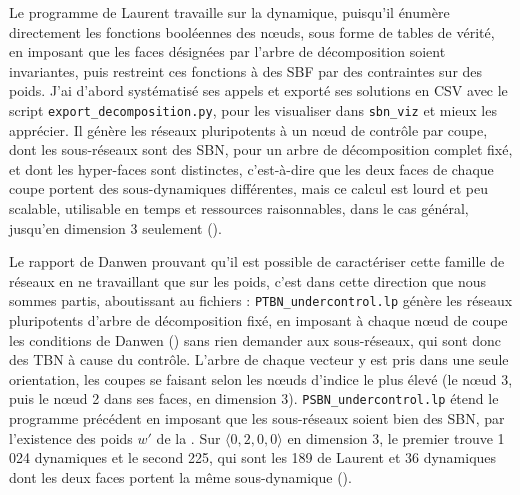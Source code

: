 \documentclass[12pt, a4paper]{article}
\begin{document}
Le programme de Laurent travaille sur la dynamique, puisqu'il énumère directement les fonctions booléennes des nœuds, sous forme de tables de vérité, en imposant que les faces désignées par l'arbre de décomposition soient invariantes, puis restreint ces fonctions à des SBF par des contraintes sur des poids.
J'ai d'abord systématisé ses appels et exporté ses solutions en CSV avec le script \texttt{export\_decomposition.py}, pour les visualiser dans \texttt{sbn\_viz} et mieux les apprécier.
Il génère les réseaux pluripotents à un nœud de contrôle par coupe, dont les sous-réseaux sont des SBN, pour un arbre de décomposition complet fixé, et dont les hyper-faces sont distinctes, c'est-à-dire que les deux faces de chaque coupe portent des sous-dynamiques différentes, mais ce calcul est lourd et peu scalable, utilisable en temps et ressources raisonnables, dans le cas général, jusqu'en dimension 3 seulement ().

Le rapport de Danwen prouvant qu'il est possible de caractériser cette famille de réseaux en ne travaillant que sur les poids, c'est dans cette direction que nous sommes partis, aboutissant au fichiers :
\texttt{PTBN\_undercontrol.lp} génère les réseaux pluripotents d'arbre de décomposition fixé, en imposant à chaque nœud de coupe les conditions de Danwen () sans rien demander aux sous-réseaux, qui sont donc des TBN à cause du contrôle.
L'arbre de chaque vecteur y est pris dans une seule orientation, les coupes se faisant selon les nœuds d'indice le plus élevé (le nœud 3, puis le nœud 2 dans ses faces, en dimension 3).
\texttt{PSBN\_undercontrol.lp} étend le programme précédent en imposant que les sous-réseaux soient bien des SBN, par l'existence des poids $w'$ de la .
Sur $\langle 0,2,0,0\rangle$ en dimension 3, le premier trouve 1\,024 dynamiques et le second 225, qui sont les 189 de Laurent et 36 dynamiques dont les deux faces portent la même sous-dynamique ().
\end{document}
